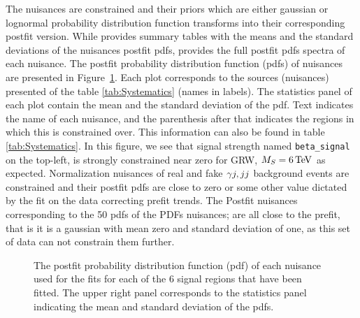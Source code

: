The nuisances are constrained and their priors which are either gaussian or lognormal probability distribution function transforms into their corresponding postfit version. While \COMBINE provides summary tables with the means and the standard deviations of the nuisances postfit pdfs, \THETA provides the full postfit pdfs spectra of each nuisance. The postfit probability distribution function (pdfs) of nuisances are presented in Figure~\ref{fig:Postfit_Nuisances_real}. Each plot corresponds to the sources (nuisances) presented of the table \ref{tab:Systematics} (names in labels). The statistics panel of each plot contain the mean and the standard deviation of the pdf.
Text indicates the name of each nuisance, and the parenthesis after that indicates the regions in which this is constrained over. This information can also be found in table \ref{tab:Systematics}. In this figure, we see that signal strength named \texttt{beta\_signal} on the top-left, is strongly constrained near zero for GRW, $M_S=6\,\text{Te\hspace{-.08em}V}$ as expected. Normalization nuisances of real \gmgm and fake $\gamma j,jj$ background events are constrained and their postfit pdfs are close to zero or some other value dictated by the fit on the data correcting prefit trends. The Postfit nuisances corresponding to the 50 pdfs of the PDFs nuisances; are all close to the prefit, that is it is a gaussian with mean zero and standard deviation of one, as this set of data can not constrain them further.



\begin{figure}[!htbp]{
\caption{The postfit probability distribution function (pdf) of each nuisance used for the fits for each of the 6 signal regions that have been fitted. The upper right panel corresponds to the statistics panel indicating the mean and standard deviation of the pdfs.}
\label{fig:Postfit_Nuisances_real} }
\end{figure}



